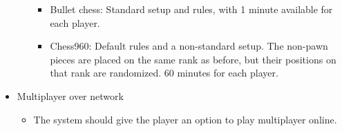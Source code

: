 \documentclass{article}
\begin{document}
\begin{itemize}
\begin{itemize}
\begin{itemize}
			\item Bullet chess: Standard setup and rules, with 1 minute available for each player.
			\item Chess960: Default rules and a non-standard setup. The non-pawn pieces are placed on the same rank as before, but their positions on that rank are randomized. 60 minutes for each player.
		\end{itemize}
	\end{itemize}
	\item Multiplayer over network
	\begin{itemize}
		\item The system should give the player an option to play multiplayer online. 
	\end{itemize} 
\end{itemize}
\end{document}
